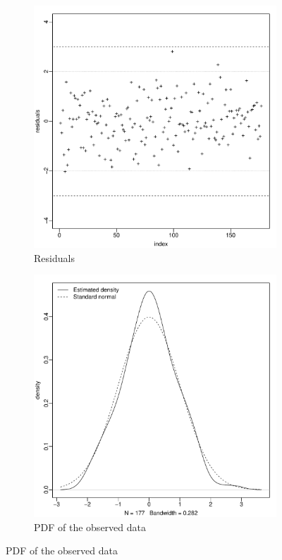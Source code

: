 \documentclass[12pt,a4paper,twoside]{article}
\begin{document}
\begin{figure}[!ht]
    \begin{subfigure}{0.5\textwidth}
        \centering
        \includegraphics[width=\textwidth]{img/BARMA-residuals.pdf}
        \caption{Residuals}
        \label{fig:BARMAresiduals}
    \end{subfigure}
    \begin{subfigure}{0.5\textwidth}
        \centering
        \includegraphics[width=\textwidth]{img/BARMA-density.pdf}
        \caption{PDF of the observed data}
        \label{fig:BARMAdensity}
    \end{subfigure}
\end{figure}
\end{document}
